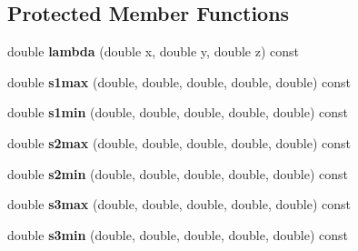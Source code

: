 \subsection*{Protected Member Functions}
\begin{DoxyCompactItemize}
\item 
\hypertarget{class_amp_wigner_a22d44e5d6baea0ecb6d6d010556f0697}{double {\bfseries lambda} (double x, double y, double z) const }\label{class_amp_wigner_a22d44e5d6baea0ecb6d6d010556f0697}

\item 
\hypertarget{class_amp_wigner_a69e8834818de83c9e9c1fc4a19c52b80}{double {\bfseries s1max} (double, double, double, double, double) const }\label{class_amp_wigner_a69e8834818de83c9e9c1fc4a19c52b80}

\item 
\hypertarget{class_amp_wigner_abc3c3bb28f8d226a6b88f512b23b5bfd}{double {\bfseries s1min} (double, double, double, double, double) const }\label{class_amp_wigner_abc3c3bb28f8d226a6b88f512b23b5bfd}

\item 
\hypertarget{class_amp_wigner_a2fea03ef732b8068724803a352a1259a}{double {\bfseries s2max} (double, double, double, double, double) const }\label{class_amp_wigner_a2fea03ef732b8068724803a352a1259a}

\item 
\hypertarget{class_amp_wigner_a1a7dbcd27bb877b2b96416aa73e8a62d}{double {\bfseries s2min} (double, double, double, double, double) const }\label{class_amp_wigner_a1a7dbcd27bb877b2b96416aa73e8a62d}

\item 
\hypertarget{class_amp_wigner_a0ef62ba8228e9dee219e901511b3d30f}{double {\bfseries s3max} (double, double, double, double, double) const }\label{class_amp_wigner_a0ef62ba8228e9dee219e901511b3d30f}

\item 
\hypertarget{class_amp_wigner_ae1b5f51dad6538742e2ffa16f09ab559}{double {\bfseries s3min} (double, double, double, double, double) const }\label{class_amp_wigner_ae1b5f51dad6538742e2ffa16f09ab559}

\end{DoxyCompactItemize}
